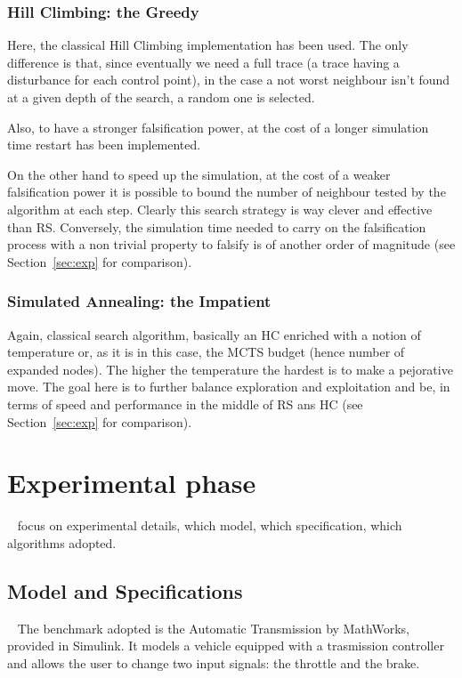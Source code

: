 \documentclass[11pt]{article}
\begin{document}
\subsubsection{Hill Climbing: the Greedy}
Here, the classical Hill Climbing implementation has been used. The only difference is that, since eventually we need a full trace (a trace having a disturbance for each control point), in the case a not worst neighbour isn't found at a given depth of the search, a random one is selected. 

Also, to have a stronger falsification power, at the cost of a longer simulation time restart has been implemented. 

On the other hand to speed up the simulation, at the cost of a weaker falsification power it is possible to bound the number of
neighbour tested by the algorithm at each step. 
Clearly this search strategy is way clever and effective than RS. Conversely, the simulation time needed to carry on the falsification process with a non trivial property to falsify is of another order of magnitude (see Section~\ref{sec:exp} for comparison).

\subsubsection{Simulated Annealing: the Impatient}
Again, classical search algorithm, basically an HC enriched with a notion of temperature or, as it is in this case, the MCTS budget (hence number of expanded nodes). The higher the temperature the hardest is to make a pejorative move. 
The goal here is to further balance exploration and exploitation and be, in terms of speed and performance in the middle of RS ans HC (see Section~\ref{sec:exp} for comparison).


\pagebreak

\section{Experimental phase}~\label{sec:exp}
focus on experimental details, which model, which specification, which algorithms adopted.

\subsection{Model and Specifications}~\label{sec:exp:spec}
The benchmark adopted is the Automatic Transmission by MathWorks, provided in Simulink. It models a vehicle equipped with a trasmission controller and allows the user to change two input signals: the     throttle and the brake.
\end{document}
